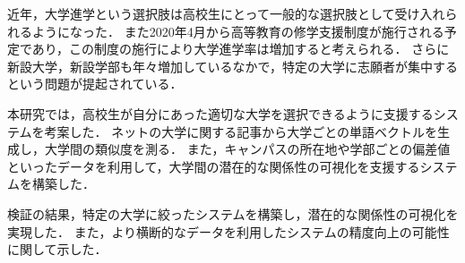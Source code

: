 
近年，大学進学という選択肢は高校生にとって一般的な選択肢として受け入れられるようになった．
また2020年4月から高等教育の修学支援制度が施行される予定であり，この制度の施行により大学進学率は増加すると考えられる．
さらに新設大学，新設学部も年々増加しているなかで，特定の大学に志願者が集中するという問題が提起されている．

本研究では，高校生が自分にあった適切な大学を選択できるように支援するシステムを考案した．
ネットの大学に関する記事から大学ごとの単語ベクトルを生成し，大学間の類似度を測る．
また，キャンパスの所在地や学部ごとの偏差値といったデータを利用して，大学間の潜在的な関係性の可視化を支援するシステムを構築した．

検証の結果，特定の大学に絞ったシステムを構築し，潜在的な関係性の可視化を実現した．
また，より横断的なデータを利用したシステムの精度向上の可能性に関して示した．
